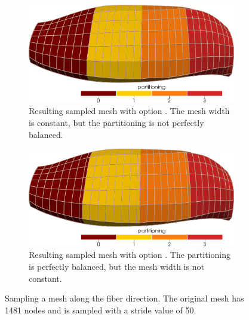\begin{figure}%
  \centering%
  \begin{subfigure}[t]{0.48\textwidth}%
    \centering%
    \includegraphics[width=\textwidth]{images/implementation/partitioning6.png}
    \caption{Resulting sampled mesh with option . The mesh width is constant, but the partitioning is not perfectly balanced.}%
    \label{fig:partitioning6}%
  \end{subfigure}
  \quad
  \begin{subfigure}[t]{0.48\textwidth}%
    \centering%
    \includegraphics[width=\textwidth]{images/implementation/partitioning5.png}
    \caption{Resulting sampled mesh with option . The partitioning is perfectly balanced, but the mesh width is not constant.}%
    \label{fig:partitioning5}%
  \end{subfigure}
  \caption{Sampling a mesh along the fiber direction. The original mesh has 1481 nodes and is sampled with a stride value of 50.}%
  \label{fig:partitioning56}%
\end{figure}%


